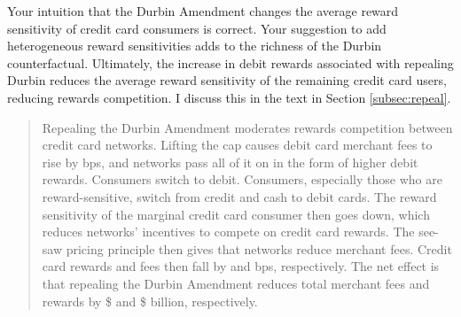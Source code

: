 \documentclass[main.tex]{subfiles}
\begin{document}
\begin{refsection}
\begin{quotation}
    \begin{table}
        \caption*{Table \ref{tab:income-sens}: Income heterogeneity in rewards sensitivity}

        \begin{center}
            \begin{small}
                
            \end{small}
        \end{center}

        
    \end{table}
\end{quotation}

Your intuition that the Durbin Amendment changes the average reward sensitivity of credit card consumers is correct.
Your suggestion to add heterogeneous reward sensitivities adds to the richness of the Durbin counterfactual.
Ultimately, the increase in debit rewards associated with repealing Durbin reduces the average reward sensitivity of the remaining credit card users, reducing rewards competition.
I discuss this in the text in Section \ref{subsec:repeal}.

\begin{quotation}
    Repealing the Durbin Amendment moderates rewards competition between credit card networks.
Lifting the cap causes debit card merchant fees to rise by  bps, and networks pass all of it on in the form of higher debit rewards.
Consumers switch to debit.
Consumers, especially those who are reward-sensitive, switch from credit and cash to debit cards.
The reward sensitivity of the marginal credit card consumer then goes down, which reduces networks' incentives to compete on credit card rewards.
The see-saw pricing principle then gives that networks reduce merchant fees.
Credit card rewards and fees then fall by  and  bps, respectively.
The net effect is that repealing the Durbin Amendment reduces total merchant fees and rewards by \$ and \$ billion, respectively.
\end{quotation}


\end{refsection}
\end{document}
